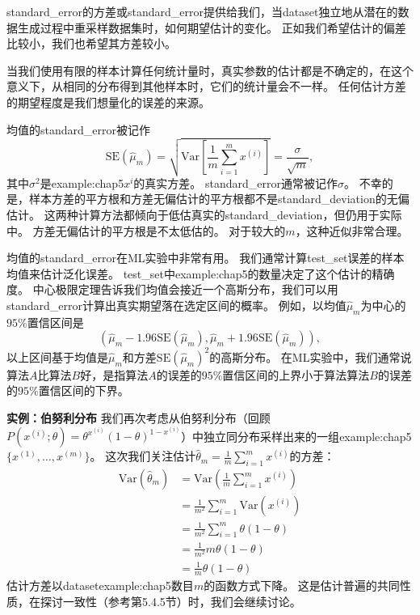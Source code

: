 \gls{standard_error}的方差或\gls{standard_error}提供给我们，当\gls{dataset}独立地从潜在的数据生成过程中重采样数据集时，如何期望估计的变化。
正如我们希望估计的偏差比较小，我们也希望其方差较小。

当我们使用有限的样本计算任何统计量时，真实参数的估计都是不确定的，在这个意义下，从相同的分布得到其他样本时，它们的统计量会不一样。
任何估计方差的期望程度是我们想量化的误差的来源。

均值的\gls{standard_error}被记作
\begin{equation}
\label{eq:5.46}
    \text{SE}(\hat{\mu}_m) = \sqrt{ \text{Var} \left[ \frac{1}{m} \sum_{i=1}^m x^{(i)} \right] } = \frac{\sigma}{\sqrt{m}},
\end{equation}
其中$\sigma^2$是\gls{example:chap5}$x^i$的真实方差。
\gls{standard_error}通常被记作$\sigma$。
不幸的是，样本方差的平方根和方差无偏估计的平方根都不是\gls{standard_deviation}的无偏估计。
这两种计算方法都倾向于低估真实的\gls{standard_deviation}，但仍用于实际中。
方差无偏估计的平方根是不太低估的。
对于较大的$m$，这种近似非常合理。


均值的\gls{standard_error}在\gls{ML}实验中非常有用。
我们通常计算\gls{test_set}误差的样本均值来估计泛化误差。
\gls{test_set}中\gls{example:chap5}的数量决定了这个估计的精确度。
中心极限定理告诉我们均值会接近一个高斯分布，我们可以用\gls{standard_error}计算出真实期望落在选定区间的概率。
例如，以均值$\hat{\mu}_m$为中心的$95\%$置信区间是
\begin{equation}
    ( \hat{\mu}_m - 1.96\text{SE}(\hat{\mu}_m), \hat{\mu}_m + 1.96 \text{SE}(\hat{\mu}_m) ),
\end{equation}
以上区间基于均值是$\hat{\mu}_m$和方差$\text{SE}(\hat{\mu}_m)^2$的高斯分布。
在\gls{ML}实验中，我们通常说算法$A$比算法$B$好，是指算法$A$的误差的$95\%$置信区间的上界小于算法算法$B$的误差的$95\%$置信区间的下界。

\textbf{实例：伯努利分布} \quad 我们再次考虑从伯努利分布（回顾$P(x^{(i)}; \theta) = \theta^{x^{(i)}} (1-\theta)^{1 - x^{(i)}}$）中独立同分布采样出来的一组\gls{example:chap5}$\{ x^{(1)}, \dots, x^{(m)} \}$。
这次我们关注估计$\hat{\theta}_m = \frac{1}{m} \sum_{i=1}^m x^{(i)}$的方差：
\begin{align}
    \text{Var}\left( \hat{\theta}_m \right) &= \text{Var}\left( \frac{1}{m} \sum_{i=1}^m x^{(i)} \right) \\
    &= \frac{1}{m^2} \sum_{i=1}^m \text{Var} \left( x^{(i)} \right) \\
    &= \frac{1}{m^2} \sum_{i=1}^m \theta (1 - \theta) \\
    &= \frac{1}{m^2} m\theta(1-\theta) \\
    &= \frac{1}{m} \theta(1-\theta)
\end{align} 
估计方差以\gls{dataset}\gls{example:chap5}数目$m$的函数方式下降。
这是估计普遍的共同性质，在探讨一致性（参考第5.4.5节）时，我们会继续讨论。

